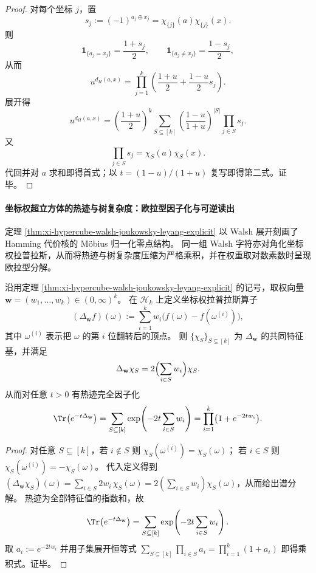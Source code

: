 \begin{proof}
对每个坐标 \(j\)，置
\[
s_j:=(-1)^{a_j\oplus x_j}=\chi_{\{j\}}(a)\chi_{\{j\}}(x).
\]
则
\[
\mathbf 1_{\{a_j=x_j\}}=\frac{1+s_j}{2},
\qquad
\mathbf 1_{\{a_j\neq x_j\}}=\frac{1-s_j}{2},
\]
从而
\[
u^{d_H(a,x)}
=
\prod_{j=1}^k
\left(
\frac{1+u}{2}+\frac{1-u}{2}s_j
\right).
\]
展开得
\[
u^{d_H(a,x)}
=
\left(\frac{1+u}{2}\right)^k
\sum_{S\subseteq[k]}
\left(\frac{1-u}{1+u}\right)^{|S|}
\prod_{j\in S}s_j.
\]
又
\[
\prod_{j\in S}s_j=\chi_S(a)\chi_S(x).
\]
代回并对 \(a\) 求和即得首式；以 \(t=(1-u)/(1+u)\) 复写即得第二式。证毕。
\end{proof}




\paragraph{坐标权超立方体的热迹与树复杂度：欧拉型因子化与可逆读出}
定理 \ref{thm:xi-hypercube-walsh-joukowsky-leyang-explicit} 以 Walsh 展开刻画了 Hamming 代价核的 Möbius 归一化零点结构。
同一组 Walsh 字符亦对角化坐标权拉普拉斯，从而将热迹与树复杂度压缩为严格乘积，并在权重取对数素数时呈现欧拉型分解。

\begin{theorem}\label{thm:xi-hypercube-weighted-laplacian-heat-trace-factorization}
沿用定理 \ref{thm:xi-hypercube-walsh-joukowsky-leyang-explicit} 的记号，取权向量 \(\mathbf w=(w_1,\dots,w_k)\in(0,\infty)^k\)。
在 \(\mathcal H_k\) 上定义坐标权拉普拉斯算子
\[
(\Delta_{\mathbf w}f)(\omega):=\sum_{i=1}^{k}w_i\bigl(f(\omega)-f(\omega^{(i)})\bigr),
\]
其中 \(\omega^{(i)}\) 表示把 \(\omega\) 的第 \(i\) 位翻转后的顶点。
则 \(\{\chi_S\}_{S\subseteq[k]}\) 为 \(\Delta_{\mathbf w}\) 的共同特征基，并满足
\[
\Delta_{\mathbf w}\chi_S=2\Bigl(\sum_{i\in S}w_i\Bigr)\chi_S.
\]
从而对任意 \(t>0\) 有热迹完全因子化
\[
\Tr\bigl(e^{-t\Delta_{\mathbf w}}\bigr)
=\sum_{S\subseteq[k]}\exp\!\left(-2t\sum_{i\in S}w_i\right)
=\prod_{i=1}^{k}\bigl(1+e^{-2tw_i}\bigr).
\]
\end{theorem}
\begin{proof}
对任意 \(S\subseteq[k]\)，若 \(i\notin S\) 则 \(\chi_S(\omega^{(i)})=\chi_S(\omega)\)；
若 \(i\in S\) 则 \(\chi_S(\omega^{(i)})=-\chi_S(\omega)\)。
代入定义得到
\(
(\Delta_{\mathbf w}\chi_S)(\omega)=\sum_{i\in S}2w_i\,\chi_S(\omega)
=2(\sum_{i\in S}w_i)\chi_S(\omega)
\)，从而给出谱分解。
热迹为全部特征值的指数和，故
\[
\Tr\bigl(e^{-t\Delta_{\mathbf w}}\bigr)
=\sum_{S\subseteq[k]}\exp\!\left(-2t\sum_{i\in S}w_i\right).
\]
取 \(a_i:=e^{-2tw_i}\) 并用子集展开恒等式
\(
\sum_{S\subseteq[k]}\prod_{i\in S}a_i=\prod_{i=1}^k(1+a_i)
\)
即得乘积式。证毕。
\end{proof}

